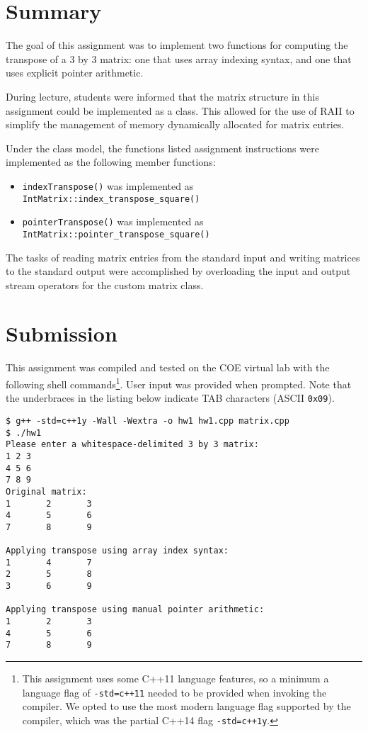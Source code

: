 \documentclass[11pt, letterpaper]{article} %
\begin{document}
  \makelabtitle
  
\section*{Summary}
The goal of this assignment was to implement two functions for computing the transpose of a $3$ by $3$ matrix: one that uses array indexing syntax, and one that uses explicit pointer arithmetic.

During lecture, students were informed that the matrix structure in this assignment could be implemented as a class. This allowed for the use of RAII \cite{cppreference-raii} to simplify the management of memory dynamically allocated for matrix entries.

Under the class model, the functions listed assignment instructions were implemented as the following member functions:
\begin{itemize}
    \item \texttt{indexTranspose()} was implemented as \texttt{IntMatrix::index\_transpose\_square()}
    \item \texttt{pointerTranspose()} was implemented as \texttt{IntMatrix::pointer\_transpose\_square()}
\end{itemize}

The tasks of reading matrix entries from the standard input and writing matrices to the standard output were accomplished by overloading the input and output stream operators for the custom matrix class. 



\section*{Submission}

This assignment was compiled and tested on the COE virtual lab \cite{coe-vlab} with the following shell commands\footnote{This assignment uses some C++11 language features, so a minimum a language flag of \texttt{-std=c++11} needed to be provided when invoking the compiler. We opted to use the most modern language flag supported by the compiler, which was the partial C++14 flag \texttt{-std=c++1y}.}. User input was provided when prompted. Note that the underbraces in the listing below indicate TAB characters (ASCII \texttt{0x09}).
\begin{lstlisting}[style=labreportstyle-sh]
$ g++ -std=c++1y -Wall -Wextra -o hw1 hw1.cpp matrix.cpp
$ ./hw1
Please enter a whitespace-delimited 3 by 3 matrix:
1 2 3
4 5 6
7 8 9
Original matrix:
1		2		3
4		5		6
7		8		9

Applying transpose using array index syntax:
1		4		7
2		5		8
3		6		9

Applying transpose using manual pointer arithmetic:
1		2		3
4		5		6
7		8		9
\end{lstlisting}






  



  
\end{document}
